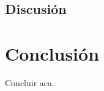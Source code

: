 \documentclass[twocolumn,11pts]{IEEEtran}
\begin{document}
\subsection{Discusión}
\section{Conclusión}
Concluir aca.



%
%

\end{document}
